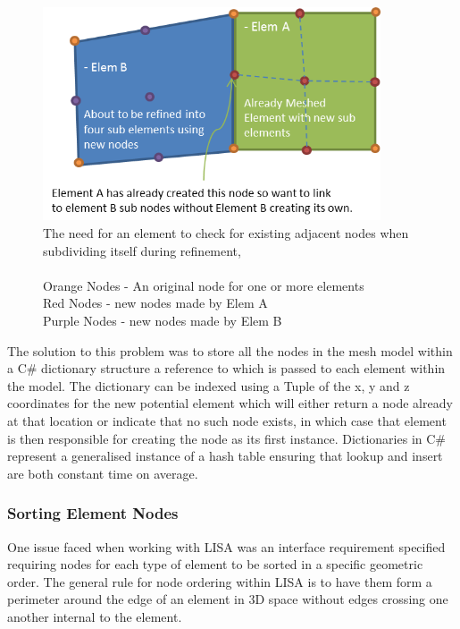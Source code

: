 \begin{figure}[!h]
  \centerline{\includegraphics[width=100mm , scale=1]{../Graphics/NodeLinking.png}}
  \caption{The need for an element to check for existing adjacent nodes when subdividing itself during refinement,\\ \\
  	Orange Nodes - An original node for one or more elements \\
	Red Nodes - new nodes made by Elem A \\
	Purple Nodes - new nodes made by Elem B \\
  }
  \label{fig:h-refinementImp}
\end{figure}


\noindent
The solution to this problem was to store all the nodes in the mesh model within a C\# dictionary structure a reference to which is passed to each element within the model. The dictionary can be indexed using a Tuple of the x, y and z coordinates for the new potential element which will either return a node already at that location or indicate that no such node exists, in which case that element is then responsible for creating the node as its first instance. Dictionaries in C\# represent a generalised instance of a hash table ensuring that lookup and insert are both constant time on average.

\newpage
\subsubsection{Sorting Element Nodes}
One issue faced when working with LISA was an interface requirement specified requiring nodes for each type of element to be sorted in a specific geometric order. The general rule for node ordering within LISA is to have them form a perimeter around the edge of an element in 3D space without edges crossing one another internal to the element. \\

